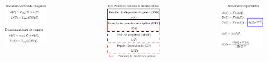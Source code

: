 \documentclass[xcolor=table,serif]{beamer}
\begin{document}
{\begin{columns}
  \begin{figure}
    \includegraphics[scale =.88]{Figures/presentation/transformations.pdf}
  \end{figure}
  \pause
  \begin{figure}
    \includegraphics[scale =.85]{Figures/presentation/definitions.pdf}
  \end{figure}
  \pause
  \begin{figure}
    \includegraphics[scale =.85]{Figures/presentation/relations.pdf}
  \end{figure}
\end{columns}
}
\end{document}
